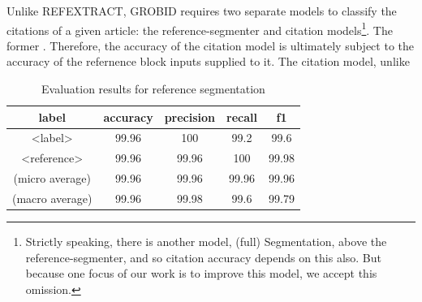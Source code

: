 Unlike REFEXTRACT, GROBID requires two separate models to classify the citations of a given article: the reference-segmenter and citation models\footnote{Strictly speaking, there is another model, (full) Segmentation, above the reference-segmenter, and so citation accuracy depends on this also. But because one focus of our work is to improve this model, we accept this omission.}. The former . Therefore, the accuracy of the citation model is ultimately subject to the accuracy of the refernence block inputs supplied to it. The citation model, unlike

\label{subsec:refextract}
\begin{table}[h]
\begin{center}
\begin{tabular}{|c|cccc|}
\hline
label		&accuracy	&precision	&recall		&f1 \\
\hline
<label>		&99.96		&100		&99.2		&99.6\\
<reference>		&99.96		&99.96		&100		&99.98\\
\hline
(micro average) & 99.96		&99.96		&99.96		&99.96	\\
(macro average) &	99.96 & 99.98	& 99.6 & 99.79	\\
\hline
\end{tabular}
\caption[Table caption text]{Evaluation results for reference segmentation}
\end{center}
\end{table}

